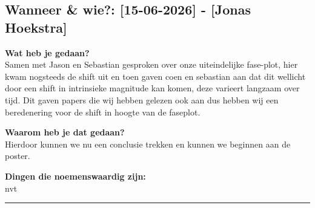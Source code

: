 
\subsection*{Wanneer \& wie?: [15-06-2026] - [Jonas Hoekstra]}

\textbf{Wat heb je gedaan?}\\
Samen met Jason en Sebastian gesproken over onze uiteindelijke fase-plot, hier kwam nogsteeds de shift uit en toen gaven coen en sebastian aan dat dit wellicht door een shift in intrinsieke magnitude kan komen, deze varieert langzaam over tijd. Dit gaven papers die wij hebben gelezen ook aan dus hebben wij een beredenering voor de shift in hoogte van de faseplot.
\vspace{0.3cm} 

\noindent \textbf{Waarom heb je dat gedaan?}\\
Hierdoor kunnen we nu een conclusie trekken en kunnen we beginnen aan de poster.

\noindent \textbf{Dingen die noemenswaardig zijn:}\\
nvt


\vspace{0.5cm}
\hrule 
\vspace{0.5cm}
